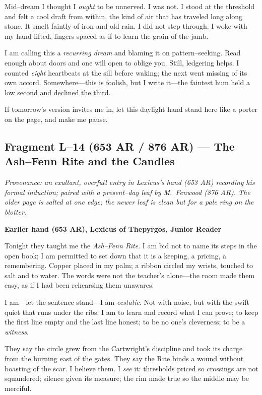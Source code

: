 \documentclass[11pt]{article}
\numberwithin{equation}{section} %
\theoremstyle{plain} %
\theoremstyle{definition} %
\theoremstyle{remark} %
\begin{document}
Mid--dream I thought I \emph{ought} to be unnerved. I was not. I stood at the threshold and felt a cool draft from within, the kind of air that has traveled long along stone. It smelt faintly of iron and old rain. I did not step through. I woke with my hand lifted, fingers spaced as if to learn the grain of the jamb.

I am calling this a \emph{recurring dream} and blaming it on pattern--seeking. Read enough about doors and one will open to oblige you. Still, ledgering helps. I counted \emph{eight} heartbeats at the sill before waking; the next went missing of its own accord. Somewhere---this is foolish, but I write it---the faintest hum held a low second and declined the third.

If tomorrow's version invites me in, let this daylight hand stand here like a porter on the page, and make me pause.

\bigskip

\subsection{Fragment L--14 (653 AR / 876 AR) --- The Ash--Fenn Rite and the Candles}
\label{frag:l14}

\noindent\textit{Provenance: an exultant, overfull entry in Lexicus's hand (653 AR) recording his formal induction; paired with a present--day leaf by M.\ Fenwood (876 AR). The older page is salted at one edge; the newer leaf is clean but for a pale ring on the blotter.}

\medskip
\noindent\textbf{Earlier hand (653 AR), Lexicus of Thepyrgos, Junior Reader}

Tonight they taught me the \textit{Ash--Fenn Rite}. I am bid not to name its steps in the open book; I am permitted to set down that it is a keeping, a pricing, a remembering. Copper placed in my palm; a ribbon circled my wrists, touched to salt and to water. The words were not the teacher's alone---the room made them easy, as if I had been rehearsing them unawares.

I am---let the sentence stand---I am \emph{ecstatic}. Not with noise, but with the swift quiet that runs under the ribs. I am to learn and record what I can prove; to keep the first line empty and the last line honest; to be no one's cleverness; to be a \emph{witness}.

They say the circle grew from the Cartwright's discipline and took its charge from the burning east of the gates. They say the Rite binds a wound without boasting of the scar. I believe them. I \emph{see} it: thresholds priced so crossings are not squandered; silence given its measure; the rim made true so the middle may be merciful.
\end{document}
